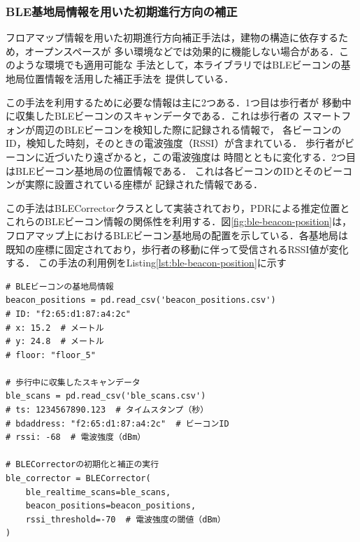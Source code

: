 

\subsubsection{BLE基地局情報を用いた初期進行方向の補正}




フロアマップ情報を用いた初期進行方向補正手法は，建物の構造に依存するため，オープンスペースが
多い環境などでは効果的に機能しない場合がある．このような環境でも適用可能な
手法として，本ライブラリではBLEビーコンの基地局位置情報を活用した補正手法を
提供している．

この手法を利用するために必要な情報は主に2つある．1つ目は歩行者が
移動中に収集したBLEビーコンのスキャンデータである．これは歩行者の
スマートフォンが周辺のBLEビーコンを検知した際に記録される情報で，
各ビーコンのID，検知した時刻，そのときの電波強度（RSSI）が含まれている．
歩行者がビーコンに近づいたり遠ざかると，この電波強度は
時間とともに変化する．2つ目はBLEビーコン基地局の位置情報である．
これは各ビーコンのIDとそのビーコンが実際に設置されている座標が
記録された情報である．

この手法はBLECorrectorクラスとして実装されており，PDRによる推定位置と
これらのBLEビーコン情報の関係性を利用する．図\ref{fig:ble-beacon-position}は，
フロアマップ上におけるBLEビーコン基地局の配置を示している．各基地局は
既知の座標に固定されており，歩行者の移動に伴って受信されるRSSI値が変化する．
この手法の利用例をListing\ref{lst:ble-beacon-position}に示す

\begin{lstlisting}[caption={BLECorrector},label=lst:ble-beacon-position,float=h]
# BLEビーコンの基地局情報
beacon_positions = pd.read_csv('beacon_positions.csv')
# ID: "f2:65:d1:87:a4:2c"
# x: 15.2  # メートル
# y: 24.8  # メートル
# floor: "floor_5"

# 歩行中に収集したスキャンデータ
ble_scans = pd.read_csv('ble_scans.csv')
# ts: 1234567890.123  # タイムスタンプ（秒）
# bdaddress: "f2:65:d1:87:a4:2c"  # ビーコンID
# rssi: -68  # 電波強度（dBm）

# BLECorrectorの初期化と補正の実行
ble_corrector = BLECorrector(
    ble_realtime_scans=ble_scans,
    beacon_positions=beacon_positions,
    rssi_threshold=-70  # 電波強度の閾値（dBm）
)
\end{lstlisting}



